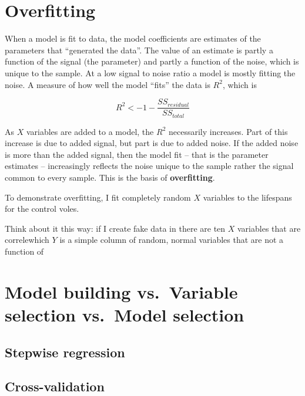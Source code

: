 \documentclass[]{book}
\begin{document}
\hypertarget{overfitting}{%
\section{Overfitting}\label{overfitting}}

When a model is fit to data, the model coefficients are estimates of the parameters that ``generated the data''. The value of an estimate is partly a function of the signal (the parameter) and partly a function of the noise, which is unique to the sample. At a low signal to noise ratio a model is mostly fitting the noise. A measure of how well the model ``fits'' the data is \(R^2\), which is

\begin{equation}
R^2 <- 1 - \frac{SS_{residual}}{SS_{total}}
\end{equation}

As \(X\) variables are added to a model, the \(R^2\) necessarily increases. Part of this increase is due to added signal, but part is due to added noise. If the added noise is more than the added signal, then the model fit -- that is the parameter estimates -- increasingly reflects the noise unique to the sample rather the signal common to every sample. This is the basis of \textbf{overfitting}.

To demonstrate overfitting, I fit completely random \(X\) variables to the lifespans for the control voles.

Think about it this way: if I create fake data in there are ten \(X\) variables that are correlewhich \(Y\) is a simple column of random, normal variables that are not a function of

\hypertarget{model-building-vs.-variable-selection-vs.-model-selection}{%
\section{Model building vs.~Variable selection vs.~Model selection}\label{model-building-vs.-variable-selection-vs.-model-selection}}

\hypertarget{stepwise-regression}{%
\subsection{Stepwise regression}\label{stepwise-regression}}

\hypertarget{cross-validation}{%
\subsection{Cross-validation}\label{cross-validation}}
\end{document}
